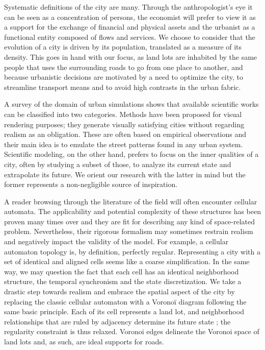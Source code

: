 \documentclass[12pt]{article}
\begin{document}
Systematic definitions of the city are many. Through the
anthropologist's eye it can be seen as a concentration of persons, the
economist will prefer to view it as a support for the exchange of
financial and physical assets and the urbanist as a functional entity
composed of flows and services. We choose to consider that the
evolution of a city is driven by its population, translated as a
measure of its density. This goes in hand with our focus, as land lots
are inhabited by the same people that uses the surrounding roads to go
from one place to another, and because urbanistic decisions are
motivated by a need to optimize the city, to streamline transport
means and to avoid high contrasts in the urban fabric.

A survey of the domain of urban simulations shows that available
scientific works can be classified into two categories. Methods have
been proposed for visual rendering purposes; they generate visually
satisfying cities without regarding realism as an obligation. These
are often based on empirical observations and their main idea is to
emulate the street patterns found in any urban system. Scientific
modeling, on the other hand, prefers to focus on the inner qualities
of a city, often by studying a subset of those, to analyze its current
state and extrapolate its future. We orient our research with the
latter in mind but the former represents a non-negligible source of
inspiration.

A reader browsing through the literature of the field will often
encounter cellular automata. The applicability and potential
complexity of these structures has been proven many times over and
they are fit for describing any kind of space-related
problem. Nevertheless, their rigorous formalism may sometimes restrain
realism and negatively impact the validity of the model. For example,
a cellular automaton topology is, by definition, perfectly
regular. Representing a city with a set of identical and aligned cells
seems like a coarse simplification. In the same way, we may question
the fact that each cell has an identical neighborhood structure, the
temporal synchronism and the state discretization. We take a drastic
step towards realism and embrace the spatial aspect of the city by
replacing the classic cellular automaton with a Voronoï diagram
following the same basic principle. Each of its cell represents a land
lot, and neighborhood relationships that are ruled by adjacency
determine its future state ; the regularity constraint is thus
relaxed. Voronoi edges delineate the Voronoi space of land lots and,
as such, are ideal supports for roads.
\end{document}
